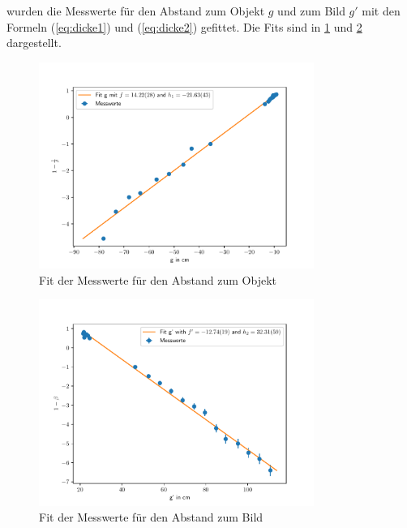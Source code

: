 \documentclass[11pt, a4paper]{article}
\begin{document}
    wurden die Messwerte für den Abstand zum Objekt $g$ und zum Bild $g'$ mit den Formeln (\ref{eq:dicke1}) und (\ref{eq:dicke2}) gefittet. Die Fits sind in \ref{fig:fit1} und \ref{fig:fit2} dargestellt.

    \begin{figure}[h]
        \centering
        \includegraphics[width=0.8\textwidth]{g.pdf}
        \caption{Fit der Messwerte für den Abstand zum Objekt}
        \label{fig:fit1}
    \end{figure}

    \begin{figure}[h]
        \centering
        \includegraphics[width=0.8\textwidth]{g_prime.pdf}
        \caption{Fit der Messwerte für den Abstand zum Bild}
        \label{fig:fit2}
    \end{figure}

\end{document}
